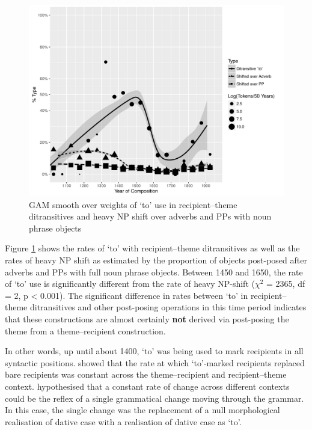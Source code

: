 \begin{figure}[t!]
	\includegraphics[width=\linewidth]{../analysis/shifting}
	\caption{GAM smooth over weights of `to' use in recipient--theme ditransitives and heavy NP shift over adverbs and PPs with noun phrase objects}
	\label{fig:shifting}
\end{figure}

Figure \ref{fig:shifting} shows the rates of `to' with recipient--theme ditransitives as well as the rates of heavy NP shift as estimated by the proportion of objects post-posed after adverbs and PPs with full noun phrase objects. Between 1450 and 1650, the rate of `to' use is significantly different from the rate of heavy NP-shift ($\chi^2$ =  2365, df = 2, p < 0.001). The significant difference in rates between `to' in recipient--theme ditransitives and other post-posing operations in this time period indicates that these constructions are almost certainly \textbf{not} derived via post-posing the theme from a theme--recipient construction.

In other words, up until about 1400, `to' was being used to mark recipients in all syntactic positions. \cite{Bacovcin.2016} showed that the rate at which `to'-marked recipients replaced bare recipients was constant across the theme--recipient and recipient--theme context. \cite{Kroch.1989} hypothesised that a constant rate of change across different contexts could be the reflex of a single grammatical change moving through the grammar. In this case, the single change was the replacement of a null morphological realisation of dative case with a realisation of dative case as `to'. 

